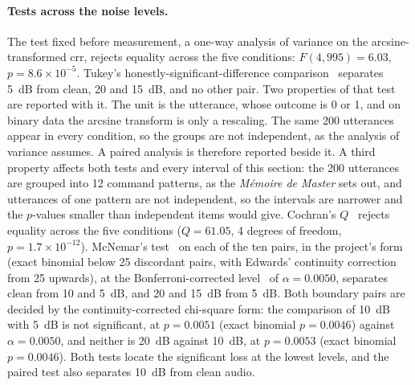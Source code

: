 \paragraph{Tests across the noise levels.} The test fixed before measurement, a one-way analysis of
variance on the arcsine-transformed \gls{crr}, rejects equality across the five conditions:
$F(4, 995) = 6.03$, $p = 8.6 \times 10^{-5}$.
Tukey's honestly-significant-difference comparison~\cite{kramer1956} separates 5~dB from clean, 20
and 15~dB, and no other pair. Two properties of that test are reported with it. The unit is the
utterance, whose outcome is 0 or 1, and on binary data the arcsine transform is only a rescaling.
The same 200 utterances appear in every condition, so the groups are not independent, as the
analysis of variance assumes. A paired analysis is therefore reported beside it. A third property
affects both tests and every interval of this section: the 200 utterances are grouped into 12
command patterns, as the \emph{M\'emoire de Master} sets out, and utterances of one pattern are not
independent, so the intervals are narrower and the $p$-values smaller than independent items would
give. Cochran's $Q$~\cite{cochran1950} rejects equality across the five conditions ($Q = 61.05$,
4 degrees of freedom, $p = 1.7 \times 10^{-12}$). McNemar's test~\cite{mcnemar1947} on each of the
ten pairs, in the project's form (exact binomial below 25 discordant pairs, with Edwards' continuity
correction~\cite{edwards1948} from 25 upwards), at the Bonferroni-corrected level~\cite{dunn1961}
of $\alpha = 0.0050$, separates clean from 10 and 5~dB, and 20 and 15~dB from 5~dB. Both boundary
pairs are decided by the continuity-corrected chi-square form: the comparison of 10~dB with 5~dB is
not significant, at $p = 0.0051$ (exact binomial $p = 0.0046$) against $\alpha = 0.0050$, and neither
is 20~dB against 10~dB, at $p = 0.0053$ (exact binomial $p = 0.0046$). Both tests locate the
significant loss at the lowest levels, and the paired test also separates 10~dB from clean audio.

